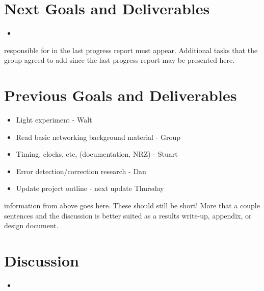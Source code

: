 \documentclass{article}
\begin{document}
\section*{Next Goals and Deliverables}
\begin{itemize}
\item

\end{itemize}

responsible for in the last progress report must appear. Additional tasks that the
group agreed to add since the last progress report may be presented here.
\section*{Previous Goals and Deliverables}
\begin{itemize}
    \item Light experiment - Walt
    \item Read basic networking background material - Group
    \item Timing, clocks, etc, (documentation, NRZ) - Stuart
    \item Error detection/correction research - Dan
    \item Update project outline - next update Thursday
\end{itemize}

information from above goes here. These should still be short! More that a couple
sentences and the discussion is better suited as a results write-up, appendix, or
design document.
\section*{Discussion}
\begin{itemize}
\item 
\end{itemize}

\end{document}

